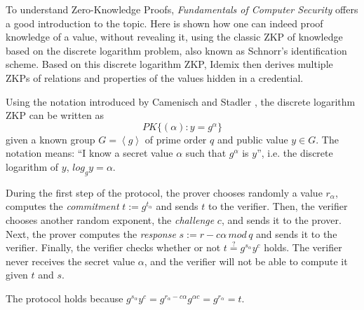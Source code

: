 
To understand Zero-Knowledge Proofs, \textit{Fundamentals of Computer Security} \cite[Chapter 12]{book:856771} offers a good introduction to the topic. Here is shown how one can indeed proof knowledge of a value, without revealing it, using the classic ZKP of knowledge based on the discrete logarithm problem, also known as Schnorr's identification scheme. Based on this discrete logarithm ZKP, Idemix then derives multiple ZKPs of relations and properties of the values hidden in a credential.


Using the notation introduced by Camenisch and Stadler \cite{camenisch1997efficient}, the discrete logarithm ZKP can be written as 
\[ PK\{ (\alpha) : y = g^\alpha \}  \]
given a known group $G=\left\langle g \right\rangle $ of prime order $q$ and public value $y\in G$. The notation means: ``I know a secret value $\alpha$ such that $g^\alpha$ is $y$'', i.e. the discrete logarithm of $y$, $log_g y = \alpha$.


During the first step of the protocol, the prover chooses randomly a value $r_\alpha$, computes the \textit{commitment} $t := g^{t_\alpha}$ and sends $t$ to the verifier. 
Then, the verifier chooses another random exponent, the \textit{challenge} $c$, and sends it to the prover. 
Next, the prover computes the \textit{response} $s:=r-c\alpha\, mod\, q$ and sends it to the verifier.
Finally, the verifier checks whether or not $ t \overset{?}{=} g^{s_\alpha} y^c $ holds. The verifier never receives the secret value $\alpha$, and the verifier will not be able to compute it given $t$ and $s$.

The protocol holds because $ g^{s_\alpha} y^c  =  g^{r_\alpha - c\alpha} g^{\alpha c} = g^{r_\alpha} = t $.

